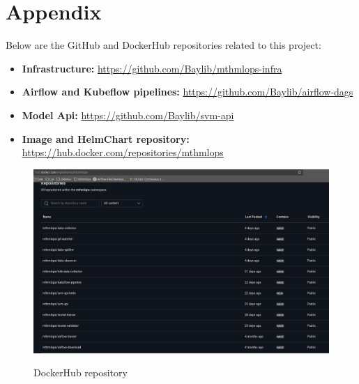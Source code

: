 \newpage
\section*{Appendix}
Below are the GitHub and DockerHub repositories related to this project:
\begin{itemize}
    \item \textbf{Infrastructure:} \url{https://github.com/Baylib/mthmlops-infra}
    \item \textbf{Airflow and Kubeflow pipelines:} \url{https://github.com/Baylib/airflow-dags}
    \item \textbf{Model Api:} \url{https://github.com/Baylib/svm-api}
    \item \textbf{Image and HelmChart repository:} \url{https://hub.docker.com/repositories/mthmlops}
\end{itemize}

\begin{figure}[!htbp]
    \centering
    \caption{DockerHub repository}
    \includegraphics[width=\textwidth]{images/project/dockerhub-repo-annexes}
    \label{fig:dockerhub}
\end{figure}
